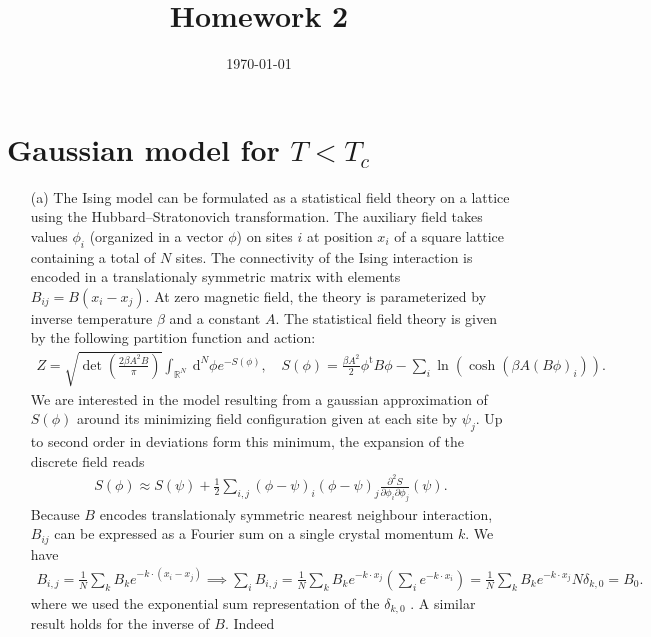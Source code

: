 \documentclass[10pt, a4paper]{article}
\title{Homework 2} %
\author{\PA} %
\date{\today} %
\begin{document}
\maketitlepage

\maketableofcontents


\footnotesize{
\section{Gaussian model for $T<T_c$}
\begin{enumerate}
  \item[(a)] The Ising model can be formulated as a statistical field theory on a lattice using the Hubbard–Stratonovich transformation. The auxiliary field takes values $\phi_i$ (organized in a vector $\phi$) on sites $i$ at position $x_i$ of a square lattice containing a total of $N$ sites. The connectivity of the Ising interaction is encoded in a translationaly symmetric matrix with elements $B_{ij} = B(x_i - x_j)$. At zero magnetic field, the theory is parameterized by inverse temperature $\beta$ and a constant $A$. The statistical field theory is given by the following partition function and action:
  \begin{align*}
    Z=\sqrt{\operatorname{det}\left(\frac{2 \beta A^2 B}{\pi}\right)} \int_{\mathbb{R}^N} \mathrm{~d}^N \phi e^{-S(\phi)}, \quad S(\phi)=\frac{\beta A^2}{2} \phi^{\mathrm{t}} B \phi-\sum_i \ln \left(\cosh \left(\beta A(B \phi)_i\right)\right).
  \end{align*}
  We are interested in the model resulting from a gaussian approximation of $S(\phi)$ around its minimizing field configuration given at each site by $\psi_j$. Up to second order in deviations form this minimum, the expansion of the discrete field reads
  \begin{align*}
    S(\phi) \approx S(\psi)+\frac{1}{2} \sum_{i, j}(\phi-\psi)_i(\phi-\psi)_j \frac{\partial^2 S}{\partial \phi_i \partial \phi_j}(\psi). 
  \end{align*}
  Because $B$ encodes translationaly symmetric nearest neighbour interaction, $B_{ij}$ can be expressed \cite{CitekeyBook} as a Fourier sum on a single crystal momentum $k$. We have 
  \begin{align*}
    B_{i, j} = \frac{1}{N}\sum_{k} B_k e^{-k \cdot (x_i - x_j)}  \implies \sum_{i} B_{i, j} = \frac{1}{N}\sum_{k} B_k e^{-k \cdot x_j} \left(\sum_i e^{-k \cdot x_i}\right) = \frac{1}{N}\sum_{k} B_k e^{-k \cdot x_j} N\delta_{k, 0} = B_0.
  \end{align*}
  where we used the exponential sum representation of the $\delta_{k, 0}$ \cite{CitekeyBook}. A similar result holds for the inverse of $B$. Indeed

\end{enumerate}}
\end{document}
